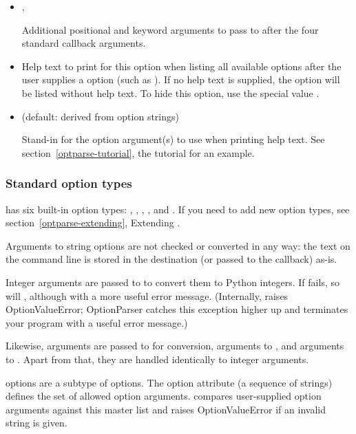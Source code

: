 \begin{itemize}
\item {} 
, 

Additional positional and keyword arguments to pass to 
after the four standard callback arguments.

\item {} 

Help text to print for this option when listing all available options
after the user supplies a  option (such as ).
If no help text is supplied, the option will be listed without help
text.  To hide this option, use the special value .

\item {} 
 (default: derived from option strings)

Stand-in for the option argument(s) to use when printing help text.
See section~\ref{optparse-tutorial}, the tutorial for an example.

\end{itemize}


\subsubsection{Standard option types\label{optparse-standard-option-types}}

 has six built-in option types: , , ,
,  and .  If you need to add new option
types, see section~\ref{optparse-extending}, Extending .

Arguments to string options are not checked or converted in any way: the
text on the command line is stored in the destination (or passed to the
callback) as-is.

Integer arguments are passed to  to convert them to Python
integers.  If  fails, so will , although with a more
useful error message.  (Internally,  raises OptionValueError;
OptionParser catches this exception higher up and terminates your
program with a useful error message.)

Likewise,  arguments are passed to  for conversion,
 arguments to , and  arguments to
.  Apart from that, they are handled identically to integer
arguments.

 options are a subtype of  options.  The 
option attribute (a sequence of strings) defines the set of allowed
option arguments.   compares
user-supplied option arguments against this master list and raises
OptionValueError if an invalid string is given.


